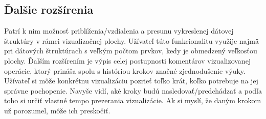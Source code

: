 \subsection{Ďalšie rozšírenia}
Patrí k nim
možnosť priblíženia/vzdialenia a presunu vykreslenej dátovej štruktúry v rámci
vizualizačnej plochy. Užívateľ túto funkcionalitu využije najmä pri dátových
štruktúrach s veľkým počtom prvkov, kedy je obmedzený veľkosťou plochy. Ďalším
rozšírením je výpis celej postupnosti komentárov vizualizovanej operácie,
ktorý prináša spolu s históriou krokov značné zjednodušenie
výuky. Užívateľ si môže konkrétnu vizualizáciu pozrieť toľko krát, koľko
potrebuje na jej správne pochopenie. Navyše vidí, aké kroky budú
nasledovať/predchádzať a podľa toho si určiť vlastné tempo prezerania
vizualizácie. Ak si myslí, že daným krokom už porozumel, môže ich preskočiť.

